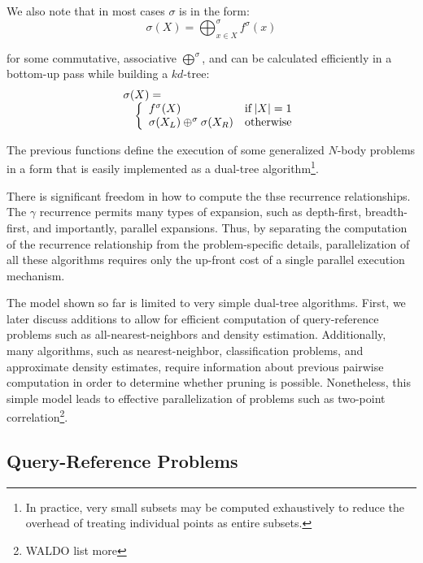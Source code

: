 \documentclass[times, 10pt,twocolumn]{article}
\DeclareMathOperator{\IF}{if}
\begin{document}
\noindent We also note that in most cases $\sigma$ is in the form:
\begin{equation}
  \sigma(X) = \bigoplus^{\sigma}_{x \in X} f^{\sigma}(x)
\end{equation}

\noindent for some commutative, associative $\bigoplus^{\sigma}$, and can be calculated efficiently in a bottom-up pass while building a $kd$-tree:
\begin{equation}
\label{eqn:sigma}
 \begin{array}{ll}
  \lefteqn{\sigma(X) =}
  \\
  & \left\{
    \begin{array}{lr}
      f^{\sigma}(X) & \IF |X| = 1
      \\
      \sigma(X_L) \oplus^{\sigma} \sigma(X_R) & \mbox{otherwise}
    \end{array}
  \right.
 \end{array}
\end{equation}

\noindent The previous functions define the execution of some generalized $N$-body problems in a form that is easily implemented as a dual-tree algorithm\footnote{In practice, very small subsets may be computed exhaustively to reduce the overhead of treating individual points as entire subsets.}.

There is significant freedom in how to compute the thse recurrence relationships.
The $\gamma$ recurrence permits many types of expansion, such as depth-first, breadth-first, and importantly, parallel expansions.
Thus, by separating the computation of the recurrence relationship from the problem-specific details, parallelization of all these algorithms requires only the up-front cost of a single parallel execution mechanism.

The model shown so far is limited to very simple dual-tree algorithms.
First, we later discuss additions to allow for efficient computation of query-reference problems such as all-nearest-neighbors and density estimation.
Additionally, many algorithms, such as nearest-neighbor, classification problems, and approximate density estimates, require information about previous pairwise computation in order to determine whether pruning is possible.
Nonetheless, this simple model leads to effective parallelization of problems such as two-point correlation\footnote{WALDO list more}.

\subsection{Query-Reference Problems}
\end{document}
